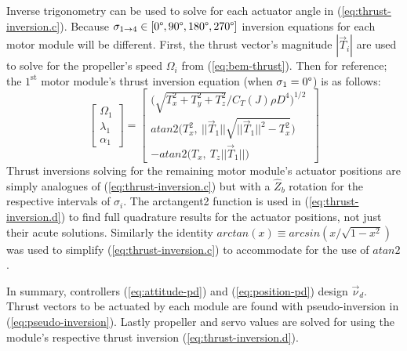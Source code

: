 \documentclass[a4paper, 10pt, conference]{ieeeconf}
\begin{document}
Inverse trigonometry can be used to solve for each actuator angle in (\ref{eq:thrust-inversion.c}). Because $\sigma_{1\rightarrow 4}\in[0\text{\textdegree},90\text{\textdegree},180\text{\textdegree},270\text{\textdegree}]$ inversion equations for each motor module will be different. First, the thrust vector's magnitude $|\vec{T}_i|$ are used to solve for the propeller's speed $\Omega_i$ from (\ref{eq:bem-thrust}). Then for reference; the $1^{\text{st}}$ motor module's thrust inversion equation (when $\sigma_1=0\text{\textdegree}$) is as follows:
\begin{equation}\label{eq:thrust-inversion.d}
\begin{bmatrix}
\Omega_1\\
\lambda_1\\
\alpha_1
\end{bmatrix}=\begin{bmatrix}
\Big(\sqrt{T_x^2+T_y^2+T_z^2}/C_T(J)\rho D^4\Big)^{1/2}\hspace{2pt}\\
atan2\Big(T_x^2,~||\vec{T}_1||\sqrt{||\vec{T}_1||^2-T_x^2}\text{}\Big)\\
-atan2\Big(T_x,~T_z||\vec{T}_1||\Big)
\end{bmatrix}
\end{equation}
Thrust inversions solving for the remaining motor module's actuator positions are simply analogues of (\ref{eq:thrust-inversion.c}) but with a $\hat{Z}_b$ rotation for the respective intervals of $\sigma_i$. The arctangent2 function is used in (\ref{eq:thrust-inversion.d}) to find full quadrature results for the actuator positions, not just their acute solutions. Similarly the identity $arctan(x)\equiv arcsin(x/\sqrt{1-x^2})$ was used to simplify (\ref{eq:thrust-inversion.c}) to accommodate for the use of $atan2$.
\par
In summary, controllers (\ref{eq:attitude-pd}) and (\ref{eq:position-pd}) design $\vec{\nu}_d$. Thrust vectors to be actuated by each module are found with pseudo-inversion in (\ref{eq:pseudo-inversion}). Lastly propeller and servo values are solved for using the module's respective thrust inversion (\ref{eq:thrust-inversion.d}).
\end{document}
